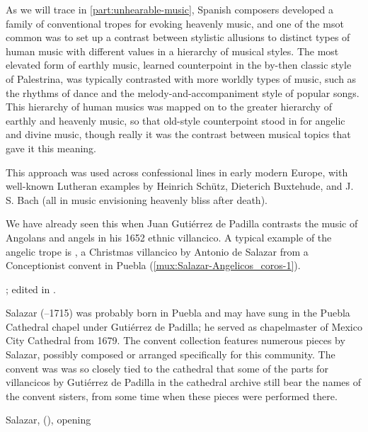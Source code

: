 As we will trace in \cref{part:unhearable-music}, Spanish composers developed a
family of conventional tropes for evoking heavenly music, and one of the msot
common was to set up a contrast between stylistic allusions to distinct types
of human music with different values in a hierarchy of musical styles.
The most elevated form of earthly music, learned counterpoint in the by-then
classic style of Palestrina, was typically contrasted with more worldly types
of music, such as the rhythms of dance and the melody-and-accompaniment style
of popular songs.
This hierarchy of human musics was mapped on to the greater hierarchy of
earthly and heavenly music, so that old-style counterpoint stood in for
angelic and divine music, though really it was the contrast between musical
topics that gave it this meaning.%
\begin{Footnote}
    This approach was used across confessional lines in early modern Europe,
    with well-known Lutheran examples by Heinrich Schütz, Dieterich Buxtehude,
    and J. S. Bach (all in music envisioning heavenly bliss after death).%
    \Autocites
    {Johnston:Rhetorical}
    {Yearsley:Buxtehude}
    [\XXX]{Yearsley:BachCounterpoint}
\end{Footnote}
We have already seen this when Juan Gutiérrez de Padilla contrasts the music of
Angolans and angels in his 1652 ethnic villancico.
A typical example of the angelic trope is , a Christmas villancico by Antonio de Salazar from a Conceptionist
convent in Puebla (\cref{mux:Salazar-Angelicos_coros-1}).%
\begin{Footnote} 
    ; edited in \autocite{Cashner:WLSCM32}.  
    \Autocite{Favila:PhD} 
\end{Footnote}
Salazar (--1715) was probably born in Puebla and may have sung in
the Puebla Cathedral chapel under Gutiérrez de Padilla; he served as
chapelmaster of Mexico City Cathedral from 1679.%
    \Autocite{Koegel:Salazar} 
The convent collection features numerous pieces by Salazar, possibly composed
or arranged specifically for this community.
The convent was was so closely tied to the cathedral that some of the parts for
villancicos by Gutiérrez de Padilla in the cathedral archive still bear the
names of the convent sisters, from some time when these pieces were performed
there.%
    \Autocite{Tello:SanchezGarzaCatalogo}

{Salazar,  (),
opening}

